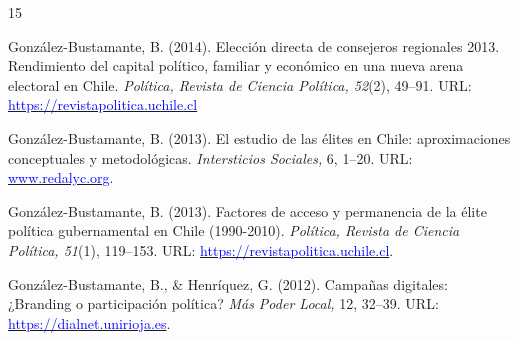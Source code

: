 \begin{publications}
\begin{benumerate}{15}
\item{González-Bustamante, B. (2014). Elección directa de consejeros regionales 2013. Rendimiento del capital político, familiar y económico en una nueva arena electoral en Chile. {\itshape Política, Revista de Ciencia Política, 52}(2), 49--91. URL: \href{https://revistapolitica.uchile.cl/index.php/RP/article/view/36137}{\textcolor{blue}{https://revistapolitica.uchile.cl}}} \vspace{1mm}

\item{González-Bustamante, B. (2013). El estudio de las élites en Chile: aproximaciones conceptuales y metodológicas. {\itshape Intersticios Sociales,} 6, 1--20. URL: \href{https://www.redalyc.org/articulo.oa?id=421739499004}{\textcolor{blue}{www.redalyc.org}}.} \vspace{1mm}

\item{González-Bustamante, B. (2013). Factores de acceso y permanencia de la élite política gubernamental en Chile (1990-2010). {\itshape Política, Revista de Ciencia Política, 51}(1), 119--153. URL: \href{https://revistapolitica.uchile.cl/index.php/RP/article/view/27436}{\textcolor{blue}{https://revistapolitica.uchile.cl}}.} \vspace{1mm} %

\item{González-Bustamante, B., \& Henríquez, G. (2012). Campañas digitales: ¿Branding o participación política? {\itshape Más Poder Local,} 12, 32--39. URL: \href{https://dialnet.unirioja.es/servlet/articulo?codigo=4013864}{\textcolor{blue}{https://dialnet.unirioja.es}}.} \vspace{1mm} %

\end{benumerate}

\end{publications}
